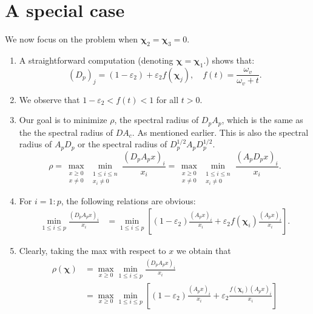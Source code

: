 \documentclass[12pt]{amsart}
\theoremstyle{definition}
\begin{document}
\section{A special case}
We now focus on the problem when $\bm{\chi}_2=\bm{\chi}_3=0$.
\begin{enumerate}
    \item A straightforward computation (denoting $\bm{\chi}=\bm{\chi}_1$.) shows that:
    \begin{equation}
        (D_p)_j=(1-\varepsilon_2)+\varepsilon_2 f(\bm{\chi}_j), \quad f(t)=\frac{\omega_v}{\omega_v+t}.
    \end{equation}
    \item We observe that $1-\varepsilon_2 < f(t) < 1$ for all $t>0$.
    \item Our goal is to minimize $\rho$, the spectral radius of $D_pA_p$, which is the same as the the spectral radius of $DA_c$. As mentioned earlier. This is also the spectral radius of $A_pD_p$ or the spectral radius of $D_p^{1/2}A_pD_p^{1/2}$.
    \begin{equation}\label{max-min-1}
\rho = \max_{\substack{x\ge 0 \\ x\neq 0}} \min_{\substack{1 \leq i  \leq n \\ x_i\neq 0}} \frac{( D_p A_px)_i}{x_i}=
\max_{\substack{x\ge 0 \\ x\neq 0}} \min_{\substack{1 \leq i  \leq n \\ x_i\neq 0}} \frac{( A_pD_px)_i}{x_i}.
\end{equation}
\item For $i=1:p$, the following relations are obvious:
    \begin{equation}
    \begin{aligned}
        \min_{1\le i\le p} \frac{(D_p A_px)_i}{x_i}&= \min_{1\le i\le p}\left[(1-\varepsilon_2)\frac{(A_px)_i}{x_i}+
        \varepsilon_2 f(\bm{\chi}_i)\frac{(A_px)_i}{x_i}\right].
    \end{aligned}        
    \end{equation}
\item Clearly, taking the max with respect to $x$ we obtain that
    \begin{equation}
    \begin{aligned}
        \rho(\bm{\chi})&=\max_{x\ge 0}
        \min_{1\le i\le p} \frac{(D_p A_px)_i}{x_i}\\
        &= \max_{x\ge 0}\min_{1\le i\le p}\left[(1-\varepsilon_2)\frac{(A_px)_i}{x_i}+
        \varepsilon_2\frac{f(\bm{\chi}_i)(A_px)_i}{x_i}\right]\\

\end{aligned}
\end{equation}
\end{enumerate}
\end{document}
